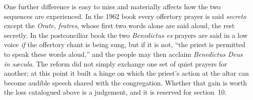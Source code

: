 One further difference is easy to miss and materially affects how the two sequences are experienced. In the 1962 book every offertory prayer is said \emph{secreto} except the \emph{Orate, fratres}, whose first two words alone are said aloud, the rest secretly. In the postconciliar book the two \emph{Benedictus es} prayers are said in a low voice \emph{if} the offertory chant is being sung, but if it is not, ``the priest is permitted to speak these words aloud,'' and the people may then acclaim \emph{Benedictus Deus in sæcula}. The reform did not simply exchange one set of quiet prayers for another; at this point it built a hinge on which the priest's action at the altar can become audible speech shared with the congregation. Whether that gain is worth the loss catalogued above is a judgement, and it is reserved for section~10.

